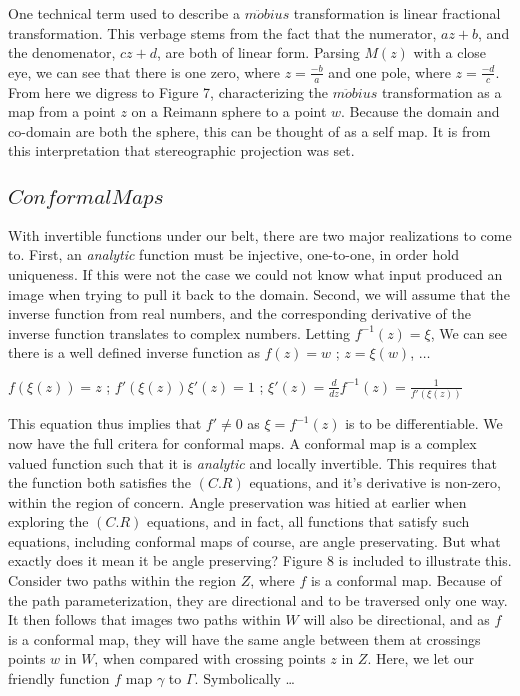 \documentclass[a4paper,man,natbib]{apa6}
\begin{document}
One technical term used to describe a $ m\ddot{o}bius $ transformation is linear fractional transformation. 
This verbage stems from the fact that the numerator, $ az + b $, and the denomenator, $ cz + d $, are both of linear form.
Parsing $ M(z) $ with a close eye, we can see that there is one zero, where $ z = \frac{-b}{a} $ and one pole, where $ z = \frac{-d}{c} $.
From here we digress to Figure 7, characterizing the $ m\ddot{o}bius $ transformation as a map from a point $ z $ on a Reimann sphere to a point $ w $.
Because the domain and co-domain are both the sphere, this can be thought of as a self map. It is from this interpretation that stereographic projection was set. 

\subsection{$ Conformal Maps $}

With invertible functions under our belt, there are two major realizations to come to.
First, an \textit{analytic} function must be injective, one-to-one, in order hold uniqueness. 
If this were not the case we could not know what input produced an image when trying to pull it back to the domain.
Second, we will assume that the inverse function from real numbers, and the corresponding derivative of the inverse function translates to complex numbers.
Letting $ f^{-1}(z) = \xi $, We can see there is a well defined inverse function as $ f(z) = w $ ; $ z = \xi(w) $, $ \dots $ 

\begin{center}

      $ f(\xi(z)) = z $ ; $ f'(\xi(z))\xi'(z) = 1 $ ; $ \xi'(z) = \frac{d}{dz}f^{-1}(z) = \frac{1}{f'(\xi(z))} $

\end{center}

This equation thus implies that $ f' \neq 0 $ as $ \xi = f^{-1}(z) $ is to be differentiable. We now have the full critera for conformal maps. 
A conformal map is a complex valued function such that it is \textit{analytic} and locally invertible. 
This requires that the function both satisfies the $ (C.R) $ equations, and it's derivative is non-zero, within the region of concern. 
Angle preservation was hitied at earlier when exploring the $ (C.R) $ equations, and in fact, all functions that satisfy such equations, including conformal maps of course, are angle preservating.
But what exactly does it mean it be angle preserving? Figure 8 is included to illustrate this.
Consider two paths within the region $ Z $, where $ f $ is a conformal map. Because of the path parameterization, they are directional and to be traversed only one way. 
It then follows that images two paths within $ W $ will also be directional, and as $ f $ is a conformal map, 
they will have the same angle between them at crossings points $ w $ in $ W $, when compared with crossing points $ z $ in $ Z $.
Here, we let our friendly function $ f $ map $ \gamma $ to $ \Gamma $. Symbolically \dots
\end{document}
